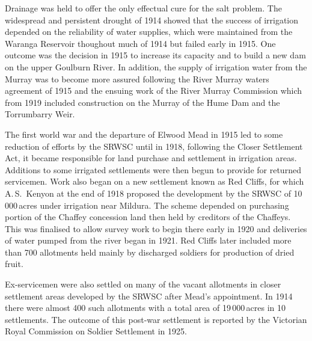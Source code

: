 Drainage  was held to offer the only effectual cure
for the salt problem.  The widespread and persistent drought of 1914
showed that the success of irrigation depended on the reliability of
water supplies, wh\-ich were maintained from the Waranga Reservoir
thoughout much of 1914 but failed early in 1915.  One outcome was the
decision in 1915 to increase its capacity and to build a new dam on
the upper Goulburn River.  In addition, the
supply of irrigation water from the Murray was to become more assured
following the River Murray waters agreement of 1915 and the ensuing
work of the River Murray Commission which from 1919 included
construction on the Murray of the Hume Dam 
 and the
Torrumbarry Weir.

The first world war and the departure of Elwood Mead 
in 1915 led to some reduction of efforts by the SRWSC until in 1918,
following the Closer Settlement Act,  it became responsible for land purchase and
settlement in irrigation areas.  Additions to some irrigated
settlements were then begun to provide for returned servicemen.  Work
also began on a new settlement known as Red Cliffs,
 for which A.\,S.~Kenyon 
 at the end of 1918 proposed the development by the SRWSC of
10\,000\,acres under irrigation near Mildura.  The scheme depended on
purchasing portion of the Chaffey concession land then held by
creditors of the Chaffeys.  This was finalised to allow survey work to
begin there early in 1920 and deliveries of water pumped from the
river began in 1921.  Red Cliffs later included more than 700
allotments held mainly by discharged soldiers for production of dried
fruit.

Ex-servicemen were also settled on many of the vacant allotments in
closer settlement areas developed by the SRWSC after Mead's
appointment.  In 1914 there were almost 400 such allotments with a
total area of 19\,000\,acres in 10 settlements. The outcome of this
post-war settlement is reported by the Victorian Royal Commission on
Soldier Settlement in 1925.

